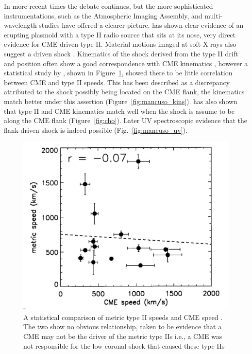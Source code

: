 In more recent times the debate continues, but the more sophisticated instrumentations, such as the Atmospheric Imaging Assembly, and multi-wavelength studies have offered a clearer picture. \citet{bain2012} has shown clear evidence of an erupting plasmoid with a type II radio source that sits at its nose, very direct evidence for CME driven type II. Material motions imaged at soft X-rays also suggest a driven shock \citep{klein1999}. Kinematics of the shock derived from the type II drift and position often show a good correspondence with CME kinematics \citep{mancuso2011}, however a statistical study by \citet{reiner2001}, shown in Figure~\ref{fig:reiner}, showed there to be little correlation between CME and type II speeds. This has been described as a discrepancy attributed to the shock possibly being located on the CME flank, the kinematics match better under this assertion \citep{mancuso2004} (Figure~\ref{fig:mancuso_kins}). \citep{cho2007, cho2012} has also shown that type II and CME kinematics match well when the shock is assume to be along the CME flank (Figure~\ref{fig:cho}). Later UV spectroscopic evidence that the flank-driven shock is indeed possible (Fig.~\ref{fig:mancuso_uv}). 
\begin{figure}[t!]
\begin{center}
\includegraphics[trim=1cm 0cm 0cm 0cm, scale=0.3]{images/reiner2001.pdf}
\caption[Statistical comparison of CME and type II height-time kinematics]{A statistical comparison of metric type II speeds and CME speed \citet{reiner2001}. The two show no obvious relationship, taken to be evidence that a CME may not be the driver of the metric type IIs i.e., a CME was not responsible for the low coronal shock that caused these type IIs}
\label{fig:reiner}
\end{center}
\end{figure}
